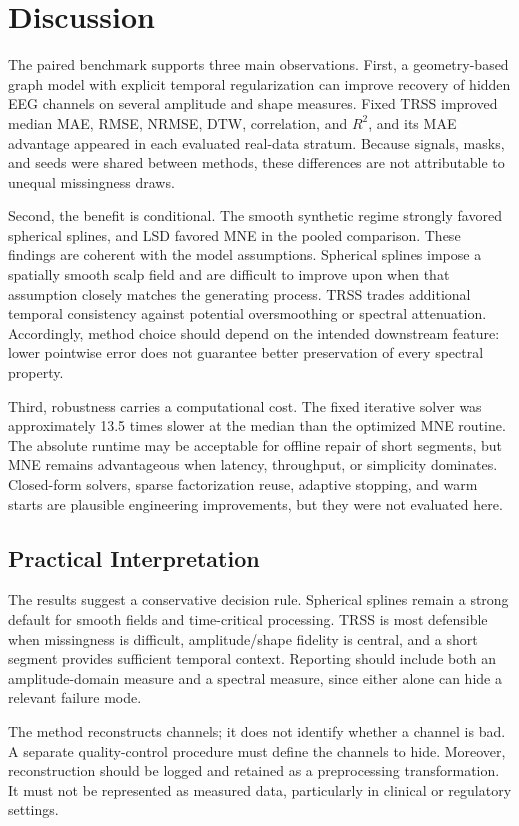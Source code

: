 \section{Discussion}
The paired benchmark supports three main observations. First, a geometry-based graph model with explicit temporal regularization can improve recovery of hidden EEG channels on several amplitude and shape measures. Fixed TRSS improved median MAE, RMSE, NRMSE, DTW, correlation, and $R^2$, and its MAE advantage appeared in each evaluated real-data stratum. Because signals, masks, and seeds were shared between methods, these differences are not attributable to unequal missingness draws.

Second, the benefit is conditional. The smooth synthetic regime strongly favored spherical splines, and LSD favored MNE in the pooled comparison. These findings are coherent with the model assumptions. Spherical splines impose a spatially smooth scalp field and are difficult to improve upon when that assumption closely matches the generating process. TRSS trades additional temporal consistency against potential oversmoothing or spectral attenuation. Accordingly, method choice should depend on the intended downstream feature: lower pointwise error does not guarantee better preservation of every spectral property.

Third, robustness carries a computational cost. The fixed iterative solver was approximately 13.5 times slower at the median than the optimized MNE routine. The absolute runtime may be acceptable for offline repair of short segments, but MNE remains advantageous when latency, throughput, or simplicity dominates. Closed-form solvers, sparse factorization reuse, adaptive stopping, and warm starts are plausible engineering improvements, but they were not evaluated here.

\subsection{Practical Interpretation}
The results suggest a conservative decision rule. Spherical splines remain a strong default for smooth fields and time-critical processing. TRSS is most defensible when missingness is difficult, amplitude/shape fidelity is central, and a short segment provides sufficient temporal context. Reporting should include both an amplitude-domain measure and a spectral measure, since either alone can hide a relevant failure mode.

The method reconstructs channels; it does not identify whether a channel is bad. A separate quality-control procedure must define the channels to hide. Moreover, reconstruction should be logged and retained as a preprocessing transformation. It must not be represented as measured data, particularly in clinical or regulatory settings.

